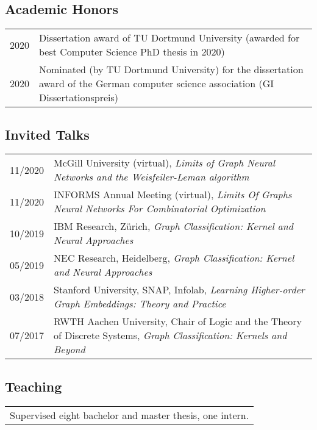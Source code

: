 \documentclass[11pt, a4paper, DIV=12]{scrartcl}
\begin{document}
\subsection*{Academic Honors}
\begin{tabular}{p{2.1cm}p{12.0cm}}
	2020& Dissertation award of TU Dortmund University (awarded for best Computer Science PhD thesis in 2020)\\
	2020& Nominated (by TU Dortmund University) for the dissertation award of the German computer science association (GI Dissertationspreis)\\
\end{tabular}

\subsection*{Invited Talks}
\begin{tabular}{p{2.1cm}p{12.0cm}}
11/2020&McGill University (virtual), \emph{Limits of Graph Neural Networks and the Weisfeiler-Leman algorithm}\\
11/2020&INFORMS Annual Meeting (virtual), \emph{Limits Of Graphs Neural Networks For Combinatorial Optimization} \\
10/2019&IBM Research, Zürich, \emph{Graph Classification: Kernel and Neural Approaches}\\
05/2019&NEC Research, Heidelberg, \emph{Graph Classification: Kernel and Neural Approaches}\\ 
03/2018&Stanford University, SNAP, Infolab, \emph{Learning Higher-order Graph Embeddings: Theory and Practice}\\
07/2017&RWTH Aachen University, Chair of Logic and the Theory of Discrete Systems, \emph{Graph Classification: Kernels and Beyond}\\

\end{tabular}





\subsection*{Teaching}
\begin{tabular}{l}
Supervised eight bachelor and master thesis, one intern.\\
\end{tabular}
\end{document}
